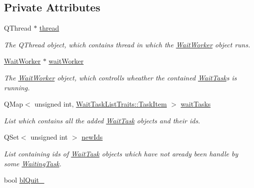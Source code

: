 \subsection*{Private Attributes}
\begin{DoxyCompactItemize}
\item 
Q\+Thread $\ast$ \hyperlink{class_wait_task_list_a853a1390df826723ab93a21b06cb6c30}{thread}
\begin{DoxyCompactList}\small\item\em The Q\+Thread object, which contains thread in which the \hyperlink{class_wait_worker}{Wait\+Worker} object runs. \end{DoxyCompactList}\item 
\hypertarget{class_wait_task_list_a35a7c23d4a05850df13e3f8f565c2ba0}{}\hyperlink{class_wait_worker}{Wait\+Worker} $\ast$ \hyperlink{class_wait_task_list_a35a7c23d4a05850df13e3f8f565c2ba0}{wait\+Worker}\label{class_wait_task_list_a35a7c23d4a05850df13e3f8f565c2ba0}

\begin{DoxyCompactList}\small\item\em The \hyperlink{class_wait_worker}{Wait\+Worker} object, which controlls wheather the contained \hyperlink{class_wait_task}{Wait\+Task}\textquotesingle{}s is running. \end{DoxyCompactList}\item 
\hypertarget{class_wait_task_list_a70ccd79d9ce35e704cafd37a57d8cc42}{}Q\+Map$<$ unsigned int, \hyperlink{struct_wait_task_list_traits_1_1_task_item}{Wait\+Task\+List\+Traits\+::\+Task\+Item} $>$ \hyperlink{class_wait_task_list_a70ccd79d9ce35e704cafd37a57d8cc42}{wait\+Tasks}\label{class_wait_task_list_a70ccd79d9ce35e704cafd37a57d8cc42}

\begin{DoxyCompactList}\small\item\em List which contains all the added \hyperlink{class_wait_task}{Wait\+Task} objects and their ids. \end{DoxyCompactList}\item 
\hypertarget{class_wait_task_list_a8c562a3ce5414dd19a4d088a01e864ad}{}Q\+Set$<$ unsigned int $>$ \hyperlink{class_wait_task_list_a8c562a3ce5414dd19a4d088a01e864ad}{new\+Ids}\label{class_wait_task_list_a8c562a3ce5414dd19a4d088a01e864ad}

\begin{DoxyCompactList}\small\item\em List containing ids of \hyperlink{class_wait_task}{Wait\+Task} objects which have not aready been handle by some \hyperlink{class_waiting_task}{Waiting\+Task}. \end{DoxyCompactList}\item 
\hypertarget{class_wait_task_list_a35a6d69e8a0d0799bcb08220f7452d87}{}bool \hyperlink{class_wait_task_list_a35a6d69e8a0d0799bcb08220f7452d87}{bl\+Quit\+\_\+}\label{class_wait_task_list_a35a6d69e8a0d0799bcb08220f7452d87}


\end{DoxyCompactItemize}
